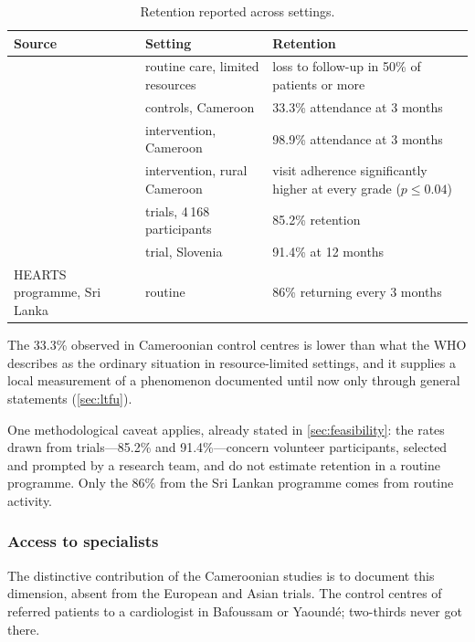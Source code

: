 \documentclass[12pt,a4paper,oneside]{report}
\begin{document}
\begin{table}[htbp]
\centering\small
\caption{Retention reported across settings.}\label{tab:retention}
\begin{tabularx}{\textwidth}{@{}>{\raggedright\arraybackslash}p{3.6cm} >{\raggedright\arraybackslash}p{3.4cm} X@{}}
\toprule
\textbf{Source} & \textbf{Setting} & \textbf{Retention} \\
\midrule
\textcite{who2023hypertension} & routine care, limited resources & loss to follow-up in 50\% of patients or more \\
\textcite{bediang2021} & controls, Cameroon & 33.3\% attendance at 3 months \\
\textcite{bediang2021} & intervention, Cameroon & 98.9\% attendance at 3 months \\
\textcite{kingue2013} & intervention, rural Cameroon & visit adherence significantly higher at every grade ($p \leq 0.04$) \\
\textcite{zhou2024} & 20 trials, 4\,168 participants & 85.2\% retention \\
\textcite{mihevc2025} & trial, Slovenia & 91.4\% at 12 months \\
HEARTS programme, Sri Lanka & routine & 86\% returning every 3 months \\
\bottomrule
\end{tabularx}
\end{table}

The 33.3\% observed in Cameroonian control centres is lower than what the WHO describes as the ordinary situation in resource-limited settings, and it supplies a local measurement of a phenomenon documented until now only through general statements (\cref{sec:ltfu}).

One methodological caveat applies, already stated in \cref{sec:feasibility}: the rates drawn from trials---85.2\% and 91.4\%---concern volunteer participants, selected and prompted by a research team, and do not estimate retention in a routine programme. Only the 86\% from the Sri Lankan programme comes from routine activity.

\subsubsection{Access to specialists}\label{sec:specialist-access}

The distinctive contribution of the Cameroonian studies is to document this dimension, absent from the European and Asian trials. The control centres of \textcite{bediang2021} referred patients to a cardiologist in Bafoussam or Yaoundé; two-thirds never got there.
\end{document}
